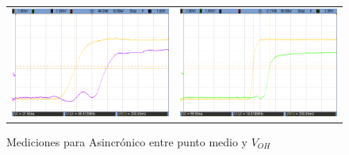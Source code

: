 \begin{figure}[H]
\begin{tabular}{c c}
            \includegraphics[scale=0.2]{../EJ7/Mediciones/Osciloscopio/Segundo_Intento/Asincronico/cropped_salida_q1.png} &
            \includegraphics[scale=0.2]{../EJ7/Mediciones/Osciloscopio/Segundo_Intento/Asincronico/cropped_salida_q2.png}
        \end{tabular}
    \caption{Mediciones para Asincr\'onico entre punto medio y $V_{OH}$}
    \label{fig:asincronico_mediciones}
\end{figure}

